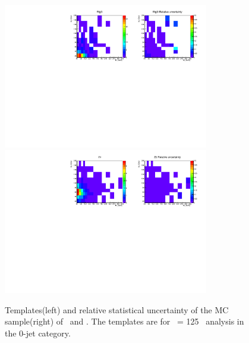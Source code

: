 \begin{figure}[htp]
\centering
\includegraphics[width=0.8\textwidth]{figures/2dtemplate_Wg3l_mH125_0j.pdf}
\includegraphics[width=0.8\textwidth]{figures/2dtemplate_Ztt_mH125_0j.pdf}
\caption{Templates(left) and relative statistical uncertainty of the MC sample(right) 
of \wgammastar\ and \ztt. 
The templates are for \mHi\ = 125 \GeV\ analysis in the 0-jet category.}
\label{fig:2dtemplate_125_0j_4}
\end{figure}
